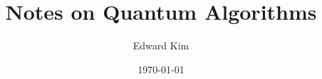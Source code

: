 \documentclass[12pt]{article}
\title{\vspace{-7ex}Notes on Quantum Algorithms \vspace{-2ex}}
\author{Edward Kim}
\date{\vspace{-2ex}\today}
\begin{document}
\maketitle





\nocite{*}


\end{document}
